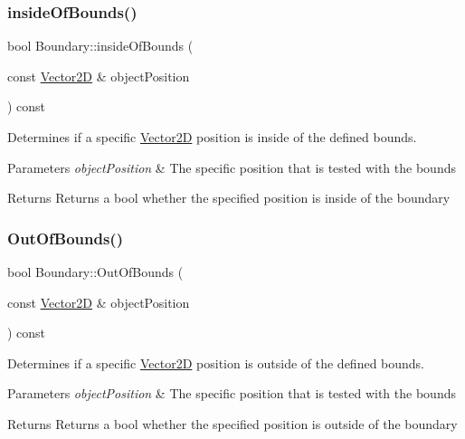 \subsubsection{\texorpdfstring{inside\+Of\+Bounds()}{insideOfBounds()}}
{\footnotesize\ttfamily bool Boundary\+::inside\+Of\+Bounds (\begin{DoxyParamCaption}\item[{const \hyperlink{class_vector2_d}{Vector2D} \&}]{object\+Position }\end{DoxyParamCaption}) const}



Determines if a specific \hyperlink{class_vector2_d}{Vector2D} position is inside of the defined bounds. 


\begin{DoxyParams}{Parameters}
{\em object\+Position} & The specific position that is tested with the bounds \\
\hline
\end{DoxyParams}
\begin{DoxyReturn}{Returns}
Returns a bool whether the specified position is inside of the boundary 
\end{DoxyReturn}
\mbox{\label{class_boundary_a92d424b11ae1362dcb0b352c9c6aaed3}} 
\subsubsection{\texorpdfstring{Out\+Of\+Bounds()}{OutOfBounds()}}
{\footnotesize\ttfamily bool Boundary\+::\+Out\+Of\+Bounds (\begin{DoxyParamCaption}\item[{const \hyperlink{class_vector2_d}{Vector2D} \&}]{object\+Position }\end{DoxyParamCaption}) const}



Determines if a specific \hyperlink{class_vector2_d}{Vector2D} position is outside of the defined bounds. 


\begin{DoxyParams}{Parameters}
{\em object\+Position} & The specific position that is tested with the bounds \\
\hline
\end{DoxyParams}
\begin{DoxyReturn}{Returns}
Returns a bool whether the specified position is outside of the boundary 
\end{DoxyReturn}



